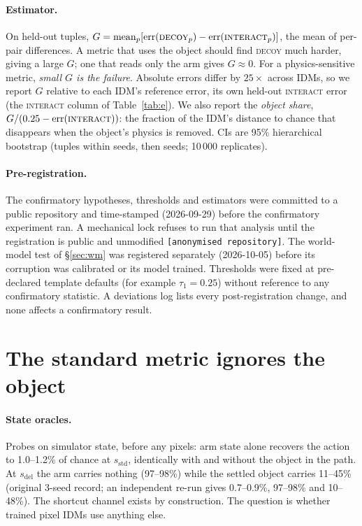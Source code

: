 \documentclass[10pt]{article}
\newcommand{\sstd}{s_{\mathrm{std}}}
\newcommand{\sdel}{s_{\mathrm{del}}}
\newcommand{\repo}{\texttt{[anonymised repository]}}
\newcommand{\cond}[1]{\textsc{#1}}
\begin{document}
\paragraph{Estimator.} On held-out tuples,
$G=\operatorname{mean}_p[\mathrm{err}(\cond{decoy}_p)-\mathrm{err}(\cond{interact}_p)]$,
the mean of per-pair differences. A metric that uses the object should find
\cond{decoy} much harder, giving a large $G$; one that reads only the arm gives
$G\approx0$. For a physics-sensitive metric, \emph{small $G$ is the failure}. Absolute
errors differ by $25\times$ across IDMs, so we report $G$ relative to each IDM's
reference error, its own held-out \cond{interact} error (the \cond{interact} column of
Table~\ref{tab:e}). We also report the \emph{object share},
$G/(0.25-\mathrm{err}(\cond{interact}))$: the fraction of the IDM's distance to chance
that disappears when the object's physics is removed. CIs are 95\% hierarchical
bootstrap (tuples within seeds, then seeds; 10\,000 replicates).

\paragraph{Pre-registration.} The confirmatory hypotheses, thresholds and estimators
were committed to a public repository and time-stamped (2026-09-29) before the
confirmatory experiment ran. A mechanical lock refuses to run that analysis until the
registration is public and unmodified \repo. The world-model test of \S\ref{sec:wm} was
registered separately (2026-10-05) before its corruption was calibrated or its model
trained. Thresholds were fixed at pre-declared template defaults (for example
$\tau_1=0.25$) without reference to any confirmatory statistic. A deviations log lists
every post-registration change, and none affects a confirmatory result.

\section{The standard metric ignores the object}
\label{sec:confound}

\paragraph{State oracles.} Probes on simulator state, before any pixels: arm state alone
recovers the action to 1.0--1.2\% of chance at $\sstd$, identically with and without the
object in the path. At $\sdel$ the arm carries nothing (97--98\%) while the settled
object carries 11--45\% (original 3-seed record; an independent re-run gives 0.7--0.9\%,
97--98\% and 10--48\%). The shortcut channel exists by construction. The question is
whether trained pixel IDMs use anything else.
\end{document}
